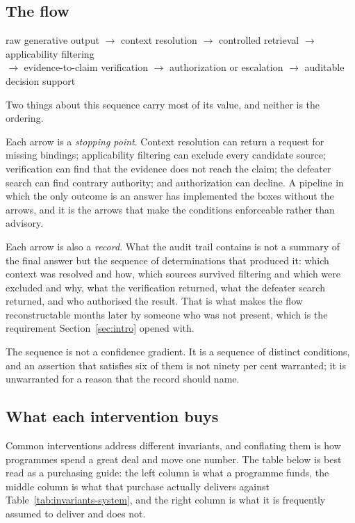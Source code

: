 \documentclass[11pt]{article}
\theoremstyle{plain}
\theoremstyle{definition}
\begin{document}
\subsection{The flow}

\begin{center}
raw generative output
$\rightarrow$ context resolution
$\rightarrow$ controlled retrieval
$\rightarrow$ applicability filtering \\
$\rightarrow$ evidence-to-claim verification
$\rightarrow$ authorization or escalation
$\rightarrow$ auditable decision support
\end{center}

Two things about this sequence carry most of its value, and neither is the ordering.

Each arrow is a \emph{stopping point}. Context resolution can return a request for
missing bindings; applicability filtering can exclude every candidate source; verification
can find that the evidence does not reach the claim; the defeater search can find contrary
authority; and authorization can decline. A pipeline in which the only outcome is an
answer has implemented the boxes without the arrows, and it is the arrows that make the
conditions enforceable rather than advisory.

Each arrow is also a \emph{record}. What the audit trail contains is not a summary of the
final answer but the sequence of determinations that produced it: which context was
resolved and how, which sources survived filtering and which were excluded and why, what
the verification returned, what the defeater search returned, and who authorised the
result. That is what makes the flow reconstructable months later by someone who was not
present, which is the requirement Section~\ref{sec:intro} opened with.

The sequence is not a confidence gradient. It is a sequence of distinct conditions, and an
assertion that satisfies six of them is not ninety per cent warranted; it is unwarranted
for a reason that the record should name.

\subsection{What each intervention buys}

Common interventions address different invariants, and conflating them is how programmes
spend a great deal and move one number. The table below is best read as a purchasing
guide: the left column is what a programme funds, the middle column is what that
purchase actually delivers against Table~\ref{tab:invariants-system}, and the right
column is what it is frequently assumed to deliver and does not.
\end{document}
